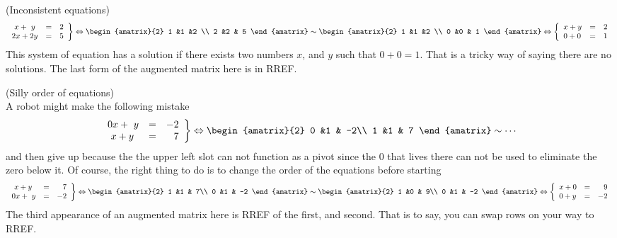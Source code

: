 \begin{example} (Inconsistent equations)
\[
   \left.
\begin{array}{lcr}
	\ x + \ y & = & 2 \\
	2x + 2y & = &  5
     \end{array}
   \right\} 
   \Leftrightarrow
\begin{amatrix}{2}
1 &1 &2 \\ 2 &2 & 5
\end{amatrix}
\sim
\begin{amatrix}{2}
1 &1 &2 \\ 0 &0 & 1
\end{amatrix}
\Leftrightarrow
\left\{
\begin{array}{lcr}
	x + y & = & 2 \\
	 0 + 0 & = &  1
     \end{array}
   \right.
\]
This system of equation has a solution if there exists two numbers $x$, and $y$ such that $0+0=1$. That is a tricky way of saying there are no solutions. The last form of the augmented matrix here is in RREF.
\end{example}


\begin{example} (Silly order of equations)\\
A robot might make the following mistake
\[
   \left.
\begin{array}{lcr}
	0x +  \ y & = & -2 \\
	\ x + y & = &  7
     \end{array}
   \right\} 
   \Leftrightarrow 
\begin{amatrix}{2}
0 &1 & -2\\ 1 &1 & 7
\end{amatrix}
\sim \cdots
\]
and then give up because the the upper left slot can not function as a pivot since the 0 that lives there can not be used to eliminate the zero below it. Of course, the right thing to do is to change the order of the equations before starting
\[
   \left.
\begin{array}{lcr}
	\ x + y & = &  7
	\\
	0x +  \ y & = & -2 
	     \end{array}
   \right\} 
   \Leftrightarrow
\begin{amatrix}{2}
1 &1 & 7\\ 0 &1 & -2
\end{amatrix}
\sim 
\begin{amatrix}{2}
1 &0 & 9\\ 0 &1 & -2
\end{amatrix}
\Leftrightarrow
\left\{
\begin{array}{lcr}
	x + 0 & = & 9 \\
	 0 + y & = & -2
     \end{array}
   \right.
\]
The third appearance of an augmented matrix here is RREF of the first, and second. That is to say, you can swap rows on your way to RREF.
\end{example}



